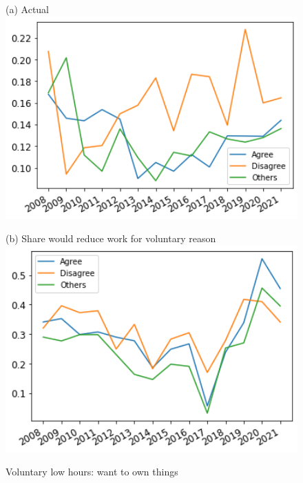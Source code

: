 \documentclass[12pt]{article}
\begin{document}
\begin{figure}[h!!]
	\centering	
	\caption{Voluntary low hours: want to own things }\label{fig:evolution_wtr_ownThings}	
	\begin{minipage}[h!!]{0.32\textwidth}  
		\centering\footnotesize{(a) Actual}
		\includegraphics[width=1\textwidth]{../codding_data/results/liss/broad_groups_work_redcuctionqk20a144_actual.png}
	\end{minipage}
	\begin{minipage}[h!!]{0.32\textwidth}
		\centering\footnotesize{(b) Share would reduce work for voluntary reason}
		\includegraphics[width=1\textwidth]{../codding_data/results/liss/broad_groups_work_redcuctionqk20a144_willing.png}
	\end{minipage}
\end{figure}
\end{document}
